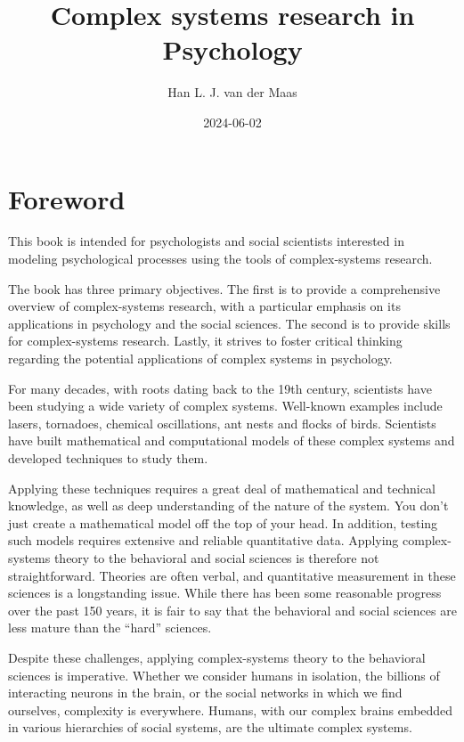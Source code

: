 \documentclass[
  a4paper,
  DIV=11,
  numbers=noendperiod,
  oneside]{scrreprt}
\title{Complex systems research in Psychology}
\author{Han L. J. van der Maas}
\date{2024-06-02}
\renewcommand*\contentsname{Table of contents}
\newcommand\contentsname{Table of contents}
\begin{document}
\maketitle

\renewcommand*\contentsname{Table of contents}
{
\hypersetup{linkcolor=}
\setcounter{tocdepth}{7}
\tableofcontents
}

\chapter*{Foreword}\label{foreword}


This book is intended for psychologists and social scientists interested
in modeling psychological processes using the tools of complex-systems
research.

The book has three primary objectives. The first is to provide a
comprehensive overview of complex-systems research, with a particular
emphasis on its applications in psychology and the social sciences. The
second is to provide skills for complex-systems research. Lastly, it
strives to foster critical thinking regarding the potential applications
of complex systems in psychology.

For many decades, with roots dating back to the 19th century, scientists
have been studying a wide variety of complex systems. Well-known
examples include lasers, tornadoes, chemical oscillations, ant nests and
flocks of birds. Scientists have built mathematical and computational
models of these complex systems and developed techniques to study them.

Applying these techniques requires a great deal of mathematical and
technical knowledge, as well as deep understanding of the nature of the
system. You don't just create a mathematical model off the top of your
head. In addition, testing such models requires extensive and reliable
quantitative data. Applying complex-systems theory to the behavioral and
social sciences is therefore not straightforward. Theories are often
verbal, and quantitative measurement in these sciences is a longstanding
issue. While there has been some reasonable progress over the past 150
years, it is fair to say that the behavioral and social sciences are
less mature than the ``hard'' sciences.

Despite these challenges, applying complex-systems theory to the
behavioral sciences is imperative. Whether we consider humans in
isolation, the billions of interacting neurons in the brain, or the
social networks in which we find ourselves, complexity is everywhere.
Humans, with our complex brains embedded in various hierarchies of
social systems, are the ultimate complex systems.
\end{document}
